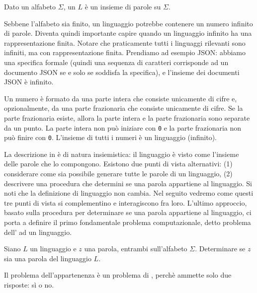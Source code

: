 \begin{definition}\label{def:linguaggio}
Dato un alfabeto $\Sigma$, un  $L$ è un insieme di parole su $\Sigma$.
\end{definition}

Sebbene l'alfabeto sia finito, un linguaggio potrebbe contenere un numero
infinito di parole.
Diventa quindi importante capire quando un linguaggio infinito ha una
rappresentazione finita.
Notare che praticamente tutti i linguaggi rilevanti sono infiniti, ma con
rappresentazione finita.
Prendiamo ad esempio JSON: abbiamo una specifica formale (quindi una sequenza di
caratteri corrisponde ad un documento JSON se e solo se soddisfa la specifica),
e l'insieme dei documenti JSON è infinito.

\begin{example}\label{exa:numeri}
Un numero è formato da una parte intera che consiste unicamente di cifre e,
opzionalmente, da una parte frazionaria che consiste unicamente di cifre.
Se la parte frazionaria esiste, allora la parte intera e la parte frazionaria
sono separate da un punto.
La parte intera non può iniziare con \texttt{0} e la parte frazionaria non può
finire con \texttt{0}.
L'insieme di tutti i numeri è un linguaggio (infinito).
\end{example}

La descrizione in  è di natura insiemistica:  il
linguaggio è visto come l'insieme delle parole che lo compongono.
Esistono due punti di vista alternativi: (1) considerare come sia possibile generare
tutte le parole di un linguaggio, (2) descrivere una procedura che determini se
una parola appartiene al linguaggio.
Si noti che la definizione di linguaggio non cambia.
Nel seguito vedremo come questi tre punti di vista si complementino e
interagiscono fra loro.
L'ultimo approccio, basato sulla procedura per determinare se una parola
appartiene al linguaggio, ci porta a definire il primo fondamentale problema
computazionale, detto problema dell' ad un linguaggio.


\begin{problem}[Appartenenza]\label{pb:appartenenza}
Siano $L$ un linguaggio e $z$ una parola, entrambi sull'alfabeto $\Sigma$.
Determinare se $z$ sia una parola del linguaggio $L$.
\end{problem}

Il problema dell'appartenenza è un problema di , perchè
ammette solo due risposte: sì o no.


